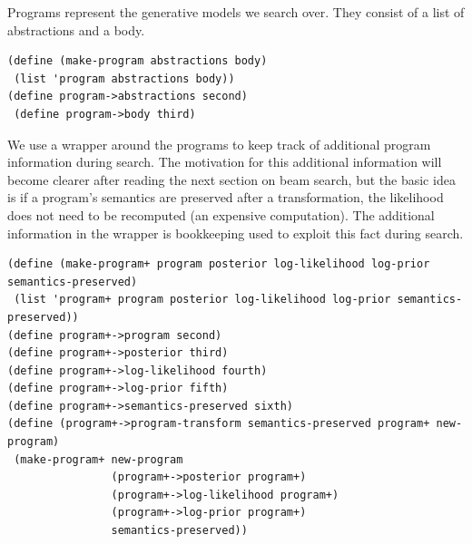 \documentclass[a4paper,10pt]{article}
\begin{document}
Programs represent the generative models we search over.  They consist of a list of abstractions and a body.
\begin{verbatim}
(define (make-program abstractions body)
 (list 'program abstractions body))
(define program->abstractions second)
 (define program->body third)
\end{verbatim}  

We use a wrapper around the programs to keep track of additional program information during search.  The motivation for this additional information will become clearer after reading the next section on beam search, but the basic idea is if a program's semantics are preserved after a transformation, the likelihood does not need to be recomputed (an expensive computation). The additional information in the wrapper is bookkeeping used to exploit this fact during search.  
\begin{verbatim}
(define (make-program+ program posterior log-likelihood log-prior semantics-preserved)
 (list 'program+ program posterior log-likelihood log-prior semantics-preserved))
(define program+->program second)
(define program+->posterior third)
(define program+->log-likelihood fourth)
(define program+->log-prior fifth)
(define program+->semantics-preserved sixth)
(define (program+->program-transform semantics-preserved program+ new-program)
 (make-program+ new-program 
                (program+->posterior program+) 
                (program+->log-likelihood program+) 
                (program+->log-prior program+) 
                semantics-preserved))
\end{verbatim}
\end{document}
